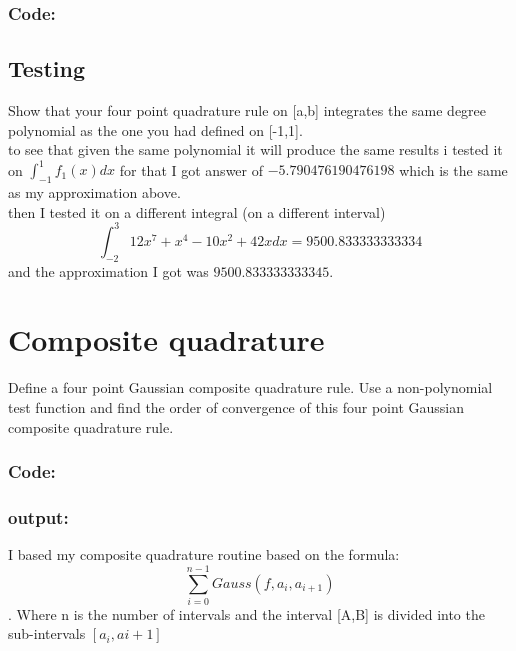 \documentclass{article}
\begin{document}
	\subsubsection*{Code:}
		
	\subsection{Testing}
		Show that your four point quadrature rule on [a,b] integrates the same degree polynomial as the one you had defined on [-1,1].\\ 
		
		to see that given the same polynomial it will produce the same results i tested it on $\int_{-1}^1f_1(x)dx$ for that I got answer of $-5.790476190476198$ which is the same as my approximation above.\\
		then I tested it on a different integral (on a different interval) 
		$$\int_{-2}^{3} 12x^7 + x^4 - 10x^2+ 42x dx = 9500.833333333334$$
		 and the approximation I got was $9500.833333333345$.
		 


\section{Composite quadrature}
	Define a four point Gaussian composite quadrature rule. Use a non-polynomial test
	function and find the order of convergence of this four point Gaussian composite
	quadrature rule. 
	\subsubsection*{Code:}
		
	\subsubsection*{output:}
	I based my composite quadrature routine based on the formula: $$\sum_{i=0}^{n-1}Gauss(f,a_{i}, a_{i+1})$$. Where n is the number of intervals and the interval [A,B] is divided into the sub-intervals $[a_{i},a{i+1}]$
	
	
\end{document}

